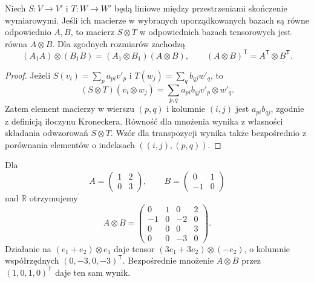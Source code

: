 \begin{twierdzenie}
\label{thm:lin9-macierz-kronecker}
Niech \(S\colon V\to V'\)
i \(T\colon W\to W'\)
będą liniowe między przestrzeniami
skończenie wymiarowymi.
Jeśli ich macierze w
wybranych uporządkowanych bazach
są równe odpowiednio \(A,B\),
to macierz \(S\otimes T\)
w odpowiednich bazach tensorowych
jest równa \(A\otimes B\).
Dla zgodnych rozmiarów zachodzą
\[
 (A_1A)\otimes(B_1B)
 =(A_1\otimes B_1)(A\otimes B),
 \qquad
 (A\otimes B)^{\mathsf T}
 =A^{\mathsf T}\otimes B^{\mathsf T}.
\]
\end{twierdzenie}
\begin{proof}
Jeżeli
\(S(v_i)=\sum_pa_{pi}v'_p\)
i \(T(w_j)=\sum_qb_{qj}w'_q\),
to
\[
 (S\otimes T)(v_i\otimes w_j)
 =\sum_{p,q}a_{pi}b_{qj}
                      v'_p\otimes w'_q.
\]
Zatem element macierzy
w wierszu \((p,q)\) i kolumnie
\((i,j)\) jest \(a_{pi}b_{qj}\),
zgodnie z definicją iloczynu
Kroneckera. Równość dla
mnożenia wynika z własności
składania odwzorowań
\(S\otimes T\).
Wzór dla transpozycji
wynika także bezpośrednio
z porównania elementów
o indeksach \(((i,j),(p,q))\).
\end{proof}

\begin{przyklad}
\label{prz:lin9-kronecker}
Dla
\[
 A=\begin{pmatrix}1&2\\0&3\end{pmatrix},
 \qquad
 B=\begin{pmatrix}0&1\\-1&0\end{pmatrix}
\]
nad \(\mathbb R\) otrzymujemy
\[
 A\otimes B=
 \begin{pmatrix}
 0&1&0&2\\
 -1&0&-2&0\\
 0&0&0&3\\
 0&0&-3&0
 \end{pmatrix}.
\]
Działanie na
\((e_1+e_2)\otimes e_1\)
daje tensor
\((3e_1+3e_2)\otimes(-e_2)\),
o kolumnie współrzędnych
\((0,-3,0,-3)^{\mathsf T}\).
Bezpośrednie mnożenie
\(A\otimes B\) przez
\((1,0,1,0)^{\mathsf T}\)
daje ten sam wynik.
\end{przyklad}

